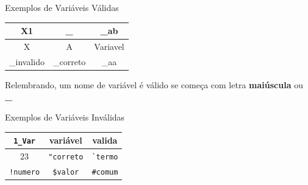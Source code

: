 \begin{frame}[fragile]
	
	\begin{exampleblock}{Exemplos de Variáveis Válidas}
		
		\begin{center}
			\begin{tabular}{c|c|c}\hline
				X1 & \textbf{\_} & \_ab \\ \hline
				X & A & Variavel \\ \hline
				\_invalido & \_correto & \_aa \\ \hline
			\end{tabular}
		\end{center}
		
		Relembrando, um nome de variável é válido se começa com letra \textbf{maiúscula} ou \textbf{\_}
		
	\end{exampleblock}
	
\end{frame}


\begin{frame}[fragile]
	
	\begin{exampleblock}{Exemplos de Variáveis Inválidas}
		
		\begin{center}
			\begin{tabular}{c|c|c}\hline
				\verb!1_Var! & variável & valida\\ \hline
				$23$ & \verb!"correto! & \verb!`termo!\\ \hline
				\verb+!numero+ & \verb!$valor! & \verb!#comum!\\ \hline
			\end{tabular}
		\end{center}
		
		
	\end{exampleblock}
	
\end{frame}


